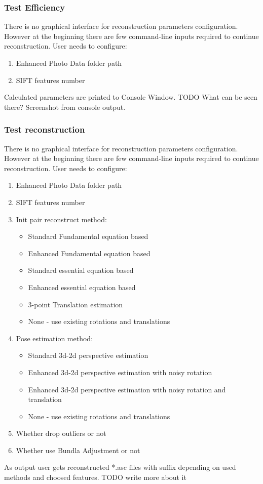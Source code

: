 \subsubsection{Test Efficiency}
There is no graphical interface for reconstruction parameters configuration. However at the beginning there are few command-line inputs required to continue reconstruction. User needs to configure:
\begin{enumerate}
\item Enhanced Photo Data folder path
\item SIFT features number
\end{enumerate}
Calculated parameters are printed to Console Window. %
TODO What can be seen there? Screenshot from console output.
\subsubsection{Test reconstruction}
There is no graphical interface for reconstruction parameters configuration. However at the beginning there are few command-line inputs required to continue reconstruction. User needs to configure:
\begin{enumerate}
\item Enhanced Photo Data folder path
\item SIFT features number
\item Init pair reconstruct method:
\begin{itemize}
\item Standard Fundamental equation based
\item Enhanced Fundamental equation based
\item Standard essential equation based
\item Enhanced essential equation based
\item 3-point Translation estimation
\item None - use existing rotations and translations
\end{itemize}
\item Pose estimation method:
\begin{itemize}
\item Standard 3d-2d perspective estimation
\item Enhanced 3d-2d perspective estimation with noisy rotation
\item Enhanced 3d-2d perspective estimation with noisy rotation and translation
\item None - use existing rotations and translations
\end{itemize}
\item Whether drop outliers or not %
\item Whether use Bundla Adjustment or not %
\end{enumerate}
As output user gets reconstructed *.asc files with suffix depending on used methods and choosed features. TODO write more about it
